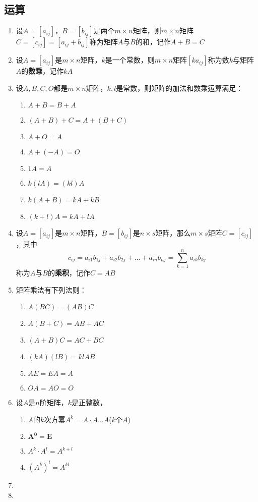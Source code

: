 \documentclass[a4paper,12pt]{article}
\begin{document}
    \subsection{运算}
    \begin{enumerate}
        \item 设$A = [a_{ij}]$，$B = [b_{ij}]$是两个$m \times n$矩阵，则$m \times n$矩阵$C = [c_{ij}] = [a_{ij} + b_{ij}]$称为矩阵$A$与$B$的和，记作$A + B = C$
        \item 设$A = [a_{ij}]$是$m \times n$矩阵，$k$是一个常数，则$m \times n$矩阵$[ka_{ij}]$称为数$k$与矩阵$A$的\textbf{数乘}，记作$kA$
        \item 设$A, B, C, O$都是$m \times n$矩阵，$k, l$是常数，则矩阵的加法和数乘运算满足：
        \begin{enumerate}
            \item $A + B = B + A$
            \item $(A + B) + C = A + (B + C)$
            \item $A + O = A$
            \item $A + (-A) = O$
            \item $1A = A$
            \item $k(lA) = (kl)A$
            \item $k(A + B) = kA + kB$
            \item $(k + l)A = kA + lA$
        \end{enumerate}
        \item 设$A = [a_{ij}]$是$m \times n$矩阵，$B = [b_{ij}]$是$n \times s$矩阵，那么$m \times s$矩阵$C = [c_{ij}]$，其中
        \[
            c_{ij} = a_{i1}b_{1j} + a_{i2}b_{2j} + \dots + a_{in}b_{nj} = \sum_{k=1}^{n} a_{ik}b_{kj}
        \]
        称为$A$与$B$的\textbf{乘积}，记作$C = AB$
        \item 矩阵乘法有下列法则：
        \begin{enumerate}
            \item $A(BC) = (AB)C$
            \item $A(B + C) = AB + AC$
            \item $(A + B)C = AC + BC$
            \item $(kA)(lB) = klAB$
            \item $AE = EA = A$
            \item $OA = AO = O$
        \end{enumerate}
        \item 设$A$是$n$阶矩阵，$k$是正整数，
        \begin{enumerate}
            \item $A$的$k$次方幂$A^k = A \cdot A \dots A$($k$个$A$)
            \item $\mathbf{A^0 = E}$
            \item $A^k \cdot A^l = A^{k+l}$
            \item $(A^k)^l = A^{kl}$
        \end{enumerate}
        \item
        \item
    \end{enumerate}
\end{document}
